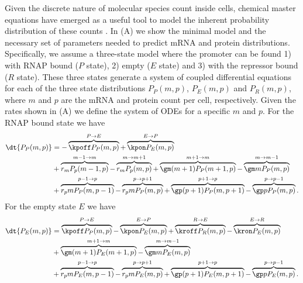 Given the discrete nature of molecular species count inside cells, chemical
master equations have emerged as a useful tool to model the inherent probability
distribution of these counts \cite{Sanchez2013}. In (A)
we show the minimal model and the necessary set of parameters needed to predict
mRNA and protein distributions. Specifically, we assume a three-state model
where the promoter can be found 1) with RNAP bound ($P$ state), 2) empty ($E$
state) and 3) with the repressor bound ($R$ state). These three states generate
a system of coupled differential equations for each of the three state
distributions $P_P(m, p)$, $P_E(m, p)$ and $P_R(m, p)$, where $m$ and $p$ are
the mRNA and protein count per cell, respectively. Given the rates shown in
(A) we define the system of ODEs for a specific $m$
and $p$. For the RNAP bound state we have
\begin{equation}
  \begin{aligned}
    \dt{P_P(m, p)} &=
    - \overbrace{\kpoff P_P(m, p)}^{P \rightarrow E} %
    + \overbrace{\kpon P_E(m, p)}^{E \rightarrow P}\\ %
    &+ \overbrace{r_m P_p(m-1, p)}^{m-1 \rightarrow m} %
    - \overbrace{r_m P_p(m, p)}^{m \rightarrow m+1}%
    + \overbrace{\gm (m + 1) P_P(m+1 , p)}^{m+1 \rightarrow m} %
    - \overbrace{\gm m P_P(m , p)}^{m \rightarrow m-1}\\ %
    &+ \overbrace{r_p m P_P(m, p - 1)}^{p-1 \rightarrow p} %
    - \overbrace{r_p m P_P(m, p)}^{p \rightarrow p+1} %
    + \overbrace{\gp (p + 1) P_P(m, p + 1)}^{p + 1 \rightarrow p} %
    - \overbrace{\gp p P_P(m, p)}^{p \rightarrow p-1}. %
  \end{aligned}
\end{equation}
For the empty state $E$ we have
\begin{equation}
  \begin{aligned}
    \dt{P_E(m, p)} &=
    \overbrace{\kpoff P_P(m, p)}^{P \rightarrow E} %
    - \overbrace{\kpon P_E(m, p)}^{E \rightarrow P} %
    + \overbrace{\kroff P_R(m, p)}^{R \rightarrow E} %
    - \overbrace{\kron P_E(m, p)}^{E \rightarrow R}\\ %
    &+ \overbrace{\gm (m + 1) P_E(m+1 , p)}^{m+1 \rightarrow m} %
    - \overbrace{\gm m P_E(m , p)}^{m \rightarrow m-1}\\ %
    &+ \overbrace{r_p m P_E(m, p - 1)}^{p-1 \rightarrow p} %
    - \overbrace{r_p m P_E(m, p)}^{p \rightarrow p+1} %
    + \overbrace{\gp (p + 1) P_E(m, p + 1)}^{p + 1 \rightarrow p} %
    - \overbrace{\gp p P_E(m, p)}^{p \rightarrow p-1}. %
  \end{aligned}
\end{equation}
